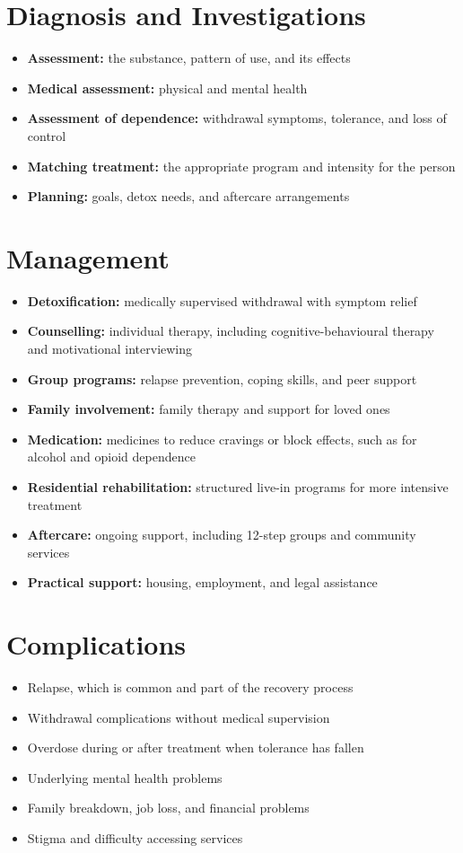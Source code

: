 \section*{Diagnosis and Investigations}
\begin{itemize}
    \item \textbf{Assessment:} the substance, pattern of use, and its effects
    \item \textbf{Medical assessment:} physical and mental health
    \item \textbf{Assessment of dependence:} withdrawal symptoms, tolerance, and loss of control
    \item \textbf{Matching treatment:} the appropriate program and intensity for the person
    \item \textbf{Planning:} goals, detox needs, and aftercare arrangements
\end{itemize}

\section*{Management}
\begin{itemize}
    \item \textbf{Detoxification:} medically supervised withdrawal with symptom relief
    \item \textbf{Counselling:} individual therapy, including cognitive-behavioural therapy and motivational interviewing
    \item \textbf{Group programs:} relapse prevention, coping skills, and peer support
    \item \textbf{Family involvement:} family therapy and support for loved ones
    \item \textbf{Medication:} medicines to reduce cravings or block effects, such as for alcohol and opioid dependence
    \item \textbf{Residential rehabilitation:} structured live-in programs for more intensive treatment
    \item \textbf{Aftercare:} ongoing support, including 12-step groups and community services
    \item \textbf{Practical support:} housing, employment, and legal assistance
\end{itemize}

\section*{Complications}
\begin{itemize}
    \item Relapse, which is common and part of the recovery process
    \item Withdrawal complications without medical supervision
    \item Overdose during or after treatment when tolerance has fallen
    \item Underlying mental health problems
    \item Family breakdown, job loss, and financial problems
    \item Stigma and difficulty accessing services
\end{itemize}


